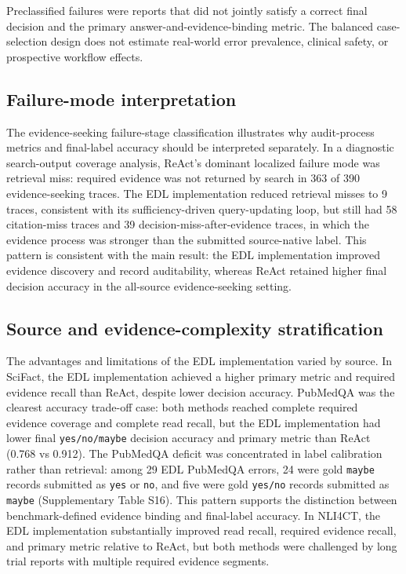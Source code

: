 \documentclass[11pt,a4paper]{article}
\begin{document}
Preclassified failures were reports that did not jointly satisfy a correct final decision and the primary answer-and-evidence-binding metric. The balanced case-selection design does not estimate real-world error prevalence, clinical safety, or prospective workflow effects.

\subsection{Failure-mode interpretation}

The evidence-seeking failure-stage classification illustrates why audit-process metrics and final-label accuracy should be interpreted separately. In a diagnostic search-output coverage analysis, ReAct's dominant localized failure mode was retrieval miss: required evidence was not returned by search in 363 of 390 evidence-seeking traces. The EDL implementation reduced retrieval misses to 9 traces, consistent with its sufficiency-driven query-updating loop, but still had 58 citation-miss traces and 39 decision-miss-after-evidence traces, in which the evidence process was stronger than the submitted source-native label. This pattern is consistent with the main result: the EDL implementation improved evidence discovery and record auditability, whereas ReAct retained higher final decision accuracy in the all-source evidence-seeking setting.

\subsection{Source and evidence-complexity stratification}

The advantages and limitations of the EDL implementation varied by source. In SciFact, the EDL implementation achieved a higher primary metric and required evidence recall than ReAct, despite lower decision accuracy. PubMedQA was the clearest accuracy trade-off case: both methods reached complete required evidence coverage and complete read recall, but the EDL implementation had lower final \texttt{yes/no/maybe} decision accuracy and primary metric than ReAct (0.768 vs 0.912). The PubMedQA deficit was concentrated in label calibration rather than retrieval: among 29 EDL PubMedQA errors, 24 were gold \texttt{maybe} records submitted as \texttt{yes} or \texttt{no}, and five were gold \texttt{yes/no} records submitted as \texttt{maybe} (Supplementary Table S16). This pattern supports the distinction between benchmark-defined evidence binding and final-label accuracy. In NLI4CT, the EDL implementation substantially improved read recall, required evidence recall, and primary metric relative to ReAct, but both methods were challenged by long trial reports with multiple required evidence segments.
\end{document}
